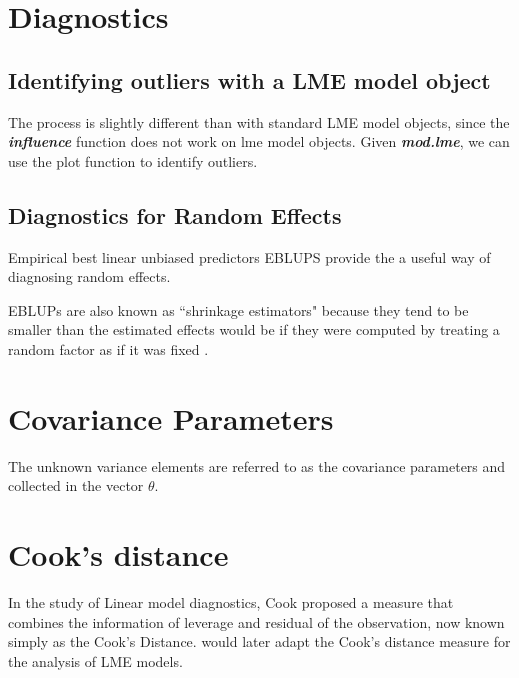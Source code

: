 \documentclass[12pt, a4paper]{report}
\theoremstyle{plain}
\theoremstyle{definition}
\theoremstyle{remark}
\begin{document}
\section{Diagnostics}

\subsection{Identifying outliers with a LME model object}

The process is slightly different than with standard LME model objects, since the \textbf{\emph{influence}}
function does not work on lme model objects. Given \textbf{\emph{mod.lme}}, we can use the plot function to
identify outliers.
\subsection{Diagnostics for Random Effects}
Empirical best linear unbiased predictors EBLUPS provide the a useful way of diagnosing random effects.

EBLUPs are also known as ``shrinkage estimators" because they tend to be smaller than the estimated effects would be if they were computed by treating a random factor as if it was fixed \citep{west}.


\section{Covariance Parameters} %
The unknown variance elements are referred to as the covariance parameters and collected in the vector $\theta$.









\section*{Cook's distance}
In the study of Linear model diagnostics, Cook proposed a measure that combines the information of leverage and residual of the observation, now known simply as the Cook's Distance. \citet{CPJ} would later adapt the Cook's distance measure for the analysis of LME models.
\end{document}
